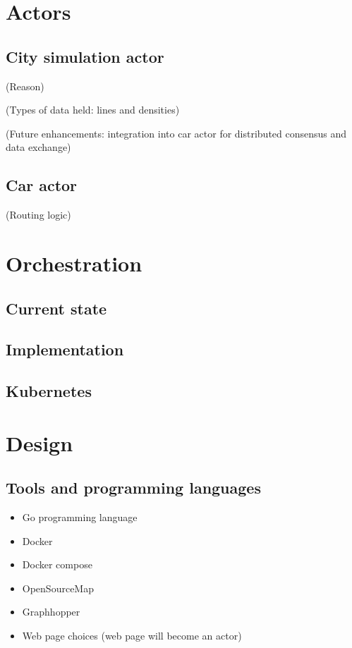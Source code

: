 \documentclass[conference]{IEEEtran}
\begin{document}
\section{Actors}

\subsection{City simulation actor}
(Reason)

(Types of data held: lines and densities)

(Future enhancements: integration into car actor for distributed consensus and data exchange)

\subsection{Car actor}
(Routing logic)

\section{Orchestration}

\subsection{Current state}

\subsection{Implementation}

\subsection{Kubernetes}

\section{Design}

\subsection{Tools and programming languages}
\begin{itemize}
\item Go programming language
\item Docker
\item Docker compose
\item OpenSourceMap
\item Graphhopper
\item Web page choices (web page will become an actor)
\end{itemize}
\end{document}
